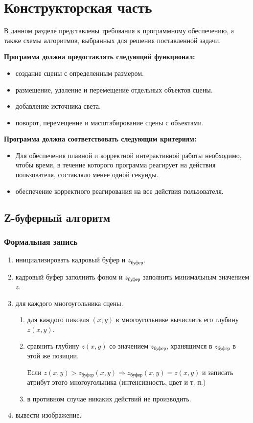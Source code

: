 \chapter{Конструкторская часть}

В данном разделе представлены требования к программному обеспечению, а также схемы алгоритмов, выбранных для решения поставленной задачи.

\textbf{Программа должна предоставлять следующий функционал:}
\begin{itemize}
\item создание сцены с определенным размером.
\item размещение, удаление и перемещение отдельных объектов сцены.
\item добавление источника света.
\item поворот, перемещение и масштабирование сцены  с объектами.
\end{itemize}

\textbf{Программа должна соответствовать следующим критериям: }
\begin{itemize}
\item Для обеспечения плавной и корректной интерактивной работы необходимо, чтобы время, в течение которого программа реагирует на действия пользователя, составляло менее одной секунды.
\item обеспечение корректного реагирования на все действия пользователя.
\end{itemize}


\section{Z-буферный алгоритм}

\subsection{Формальная запись}
\begin{enumerate}
	\item инициализировать кадровый буфер и $z_{\text{буфер}}$.
	\item кадровый буфер заполнить фоном и $z_{\text{буфер}}$ заполнить  минимальным значением $z$.
	\item для каждого многоугольника сцены.
    \begin{enumerate}[label=\arabic{enumi}.\arabic*]
		\item  для каждого пикселя $(x, y)$ в многоугольнике вычислить его глубину $z(x, y)$.
		\item  сравнить глубину $z(x, y)$ со значением  $z_{\text{буфер}}$, хранящимся в $z_{\text{буфер}}$ в этой же позиции. 
		
			Если  $z(x, y) > z_{\text{буфер}}(x, y) \Rightarrow z_{\text{буфер}}(x, y) = z(x, y) $ и записать атрибут этого многоугольника (интенсивность, цвет и т. п.)
	  
		\item в противном случае никаких действий не производить.
	\end{enumerate}
	
	\item вывести изображение.
\end{enumerate}


